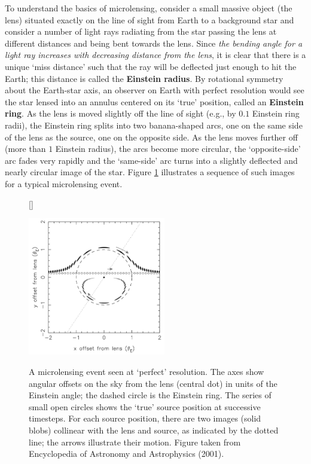 \documentclass[a4paper,10pt]{article}
\begin{document}
{\noindent}To understand the basics of microlensing, consider a small massive object (the lens) situated exactly on the line of sight from Earth to a background star and consider a number of light rays radiating from the star passing the lens at different distances and being bent towards the lens. Since \textit{the bending angle for a light ray increases with decreasing distance from the lens}, it is clear that there is a unique `miss distance' such that the ray will be deflected just enough to hit the Earth; this distance is called the \textbf{Einstein radius}. By rotational symmetry about the Earth-star axis, an observer on Earth with perfect resolution would see the star lensed into an annulus centered on its `true' position, called an \textbf{Einstein ring}. As the lens is moved slightly off the line of sight (e.g., by $0.1$ Einstein ring radii), the Einstein ring splits into two banana-shaped arcs, one on the same side of the lens as the source, one on the opposite side. As the lens moves further off (more than $1$ Einstein radius), the arcs become more circular, the `opposite-side' arc fades very rapidly and the `same-side' arc turns into a slightly deflected and nearly circular image of the star. Figure \ref{fig:microlensing} illustrates a sequence of such images for a typical microlensing event.

\begin{figure}[t]
    [\FBwidth]
    {\caption{\footnotesize{A microlensing event seen at `perfect' resolution. The axes show angular offsets on the sky from the lens (central dot) in units of the Einstein angle; the dashed circle is the Einstein ring. The series of small open circles shows the `true' source position at successive timesteps. For each source position, there are two images (solid blobs) collinear with the lens and source, as indicated by the dotted line; the arrows illustrate their motion. Figure taken from Encyclopedia of Astronomy and Astrophysics (2001).}}
    \label{fig:microlensing}}
    {\includegraphics[width=6cm]{figures/microlensing.png}}
\end{figure}
\end{document}
